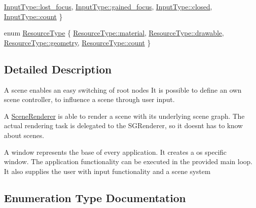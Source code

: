 \begin{DoxyCompactItemize}
\mbox{\hyperlink{namespaceec_a5de6bdb8c4b2ed6e590e721ec998f964ac3e76686badae4b6d625c39e41b23521}{Input\+Type\+::lost\+\_\+focus}}, 
\mbox{\hyperlink{namespaceec_a5de6bdb8c4b2ed6e590e721ec998f964a4a46fc9d3e3456efe6a3980f2f3fbcc0}{Input\+Type\+::gained\+\_\+focus}}, 
\mbox{\hyperlink{namespaceec_a5de6bdb8c4b2ed6e590e721ec998f964a349e686330723975502e9ef4f939a5ac}{Input\+Type\+::closed}}, 
\newline
\mbox{\hyperlink{namespaceec_a5de6bdb8c4b2ed6e590e721ec998f964ae2942a04780e223b215eb8b663cf5353}{Input\+Type\+::count}}
 \}
\item 
enum \mbox{\hyperlink{namespaceec_ae4420ccd0f79418a5ce075e43909289f}{Resource\+Type}} \{ \mbox{\hyperlink{namespaceec_ae4420ccd0f79418a5ce075e43909289faeec34d804c9ce6c89cff596be555e6a4}{Resource\+Type\+::material}}, 
\mbox{\hyperlink{namespaceec_ae4420ccd0f79418a5ce075e43909289fac571a3227368b17e0ecc38a2a417e201}{Resource\+Type\+::drawable}}, 
\mbox{\hyperlink{namespaceec_ae4420ccd0f79418a5ce075e43909289faed7daeb157cd9b31e53896ad3c771a26}{Resource\+Type\+::geometry}}, 
\mbox{\hyperlink{namespaceec_ae4420ccd0f79418a5ce075e43909289fae2942a04780e223b215eb8b663cf5353}{Resource\+Type\+::count}}
 \}
\end{DoxyCompactItemize}


\subsection{Detailed Description}
A scene enables an easy switching of root nodes It is possible to define an own scene controller, to influence a scene through user input.

A \mbox{\hyperlink{classec_1_1_scene_renderer}{Scene\+Renderer}} is able to render a scene with its underlying scene graph. The actual rendering task is delegated to the S\+G\+Renderer, so it doesn\textquotesingle{}t has to know about scenes.

A window represents the base of every application. It creates a os specific window. The application functionality can be executed in the provided main loop. It also supplies the user with input functionality and a scene system 

\subsection{Enumeration Type Documentation}
\mbox{\label{namespaceec_aeb1f95f6e5d6c17c5a67f68e44746ac4}} 
